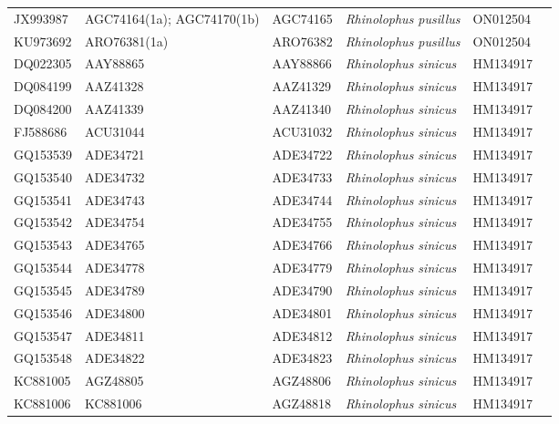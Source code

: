 \documentclass[9pt]{article}
\begin{document}
\begin{landscape}
\begin{longtable}{p{2cm} p{3cm} p{2.7cm} p{5.7cm} p{2cm} p{2cm}}
JX993987&AGC74164(1a); AGC74170(1b)&AGC74165&\textit{Rhinolophus pusillus}&ON012504& \cite{yang2013novel, wang2022coronaviruses} \\
KU973692&ARO76381(1a)&ARO76382&\textit{Rhinolophus pusillus}&ON012504& \cite{yang2013novel, wang2022coronaviruses}\\
DQ022305&AAY88865&AAY88866&\textit{Rhinolophus sinicus}&HM134917& \cite{lau2005severe}\\
DQ084199&AAZ41328&AAZ41329&\textit{Rhinolophus sinicus}&HM134917& \cite{lau2005severe}\\
DQ084200&AAZ41339&AAZ41340&\textit{Rhinolophus sinicus}&HM134917& \cite{lau2005severe}\\
FJ588686&ACU31044&ACU31032&\textit{Rhinolophus sinicus}&HM134917& \cite{lau2005severe, yuan2010intraspecies}\\
GQ153539&ADE34721&ADE34722&\textit{Rhinolophus sinicus}&HM134917& \cite{lau2005severe, yuan2010intraspecies}\\
GQ153540&ADE34732&ADE34733&\textit{Rhinolophus sinicus}&HM134917& \cite{lau2005severe, yuan2010intraspecies}\\
GQ153541&ADE34743&ADE34744&\textit{Rhinolophus sinicus}&HM134917& \cite{lau2005severe, yuan2010intraspecies}\\
GQ153542&ADE34754&ADE34755&\textit{Rhinolophus sinicus}&HM134917& \cite{lau2005severe, yuan2010intraspecies}\\
GQ153543&ADE34765&ADE34766&\textit{Rhinolophus sinicus}&HM134917& \cite{lau2005severe, yuan2010intraspecies}\\
GQ153544&ADE34778&ADE34779&\textit{Rhinolophus sinicus}&HM134917& \cite{lau2005severe, yuan2010intraspecies}\\
GQ153545&ADE34789&ADE34790&\textit{Rhinolophus sinicus}&HM134917& \cite{lau2005severe, yuan2010intraspecies}\\
GQ153546&ADE34800&ADE34801&\textit{Rhinolophus sinicus}&HM134917& \cite{lau2005severe, yuan2010intraspecies}\\
GQ153547&ADE34811&ADE34812&\textit{Rhinolophus sinicus}&HM134917& \cite{lau2005severe, yuan2010intraspecies}\\
GQ153548&ADE34822&ADE34823&\textit{Rhinolophus sinicus}&HM134917& \cite{lau2005severe,lau2010ecoepidemiology}\\
KC881005&AGZ48805&AGZ48806&\textit{Rhinolophus sinicus}&HM134917& \cite{ge2013isolation, lau2005severe}\\
KC881006&KC881006&AGZ48818&\textit{Rhinolophus sinicus}&HM134917& \cite{ge2013isolation, lau2005severe}\\

\end{longtable}
\end{landscape}
\end{document}
